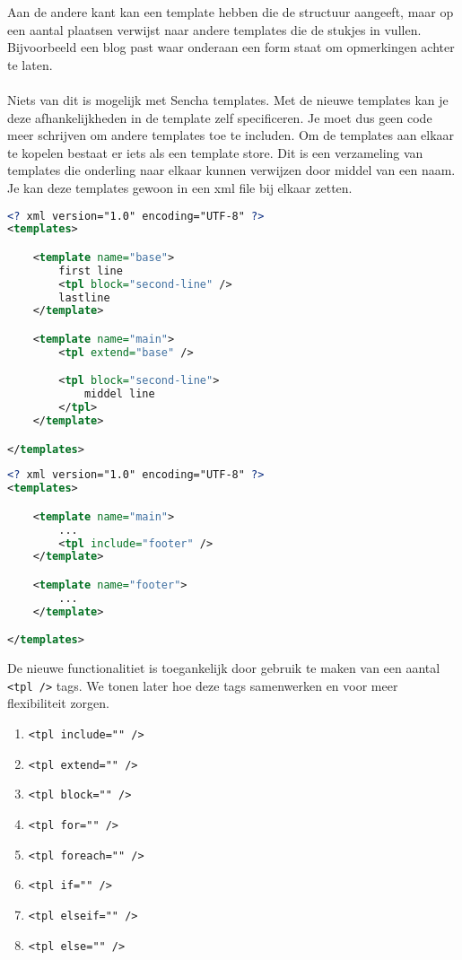Aan de andere kant kan een template hebben die de structuur aangeeft, maar op een aantal
plaatsen verwijst naar andere templates die de stukjes in vullen. Bijvoorbeeld een blog
past waar onderaan een form staat om opmerkingen achter te laten.

\paragraph {} Niets van dit is mogelijk met Sencha templates. Met de nieuwe templates kan
je deze afhankelijkheden in de template zelf specificeren. Je moet dus geen code meer
schrijven om andere templates toe te includen. Om de templates aan elkaar te kopelen
bestaat er iets als een template store. Dit is een verzameling van templates die onderling
naar elkaar kunnen verwijzen door middel van een naam. Je kan deze templates gewoon in een
xml file bij elkaar zetten.

\begin{lstlisting}[language=xml]
<? xml version="1.0" encoding="UTF-8" ?>
<templates>

	<template name="base">
		first line
		<tpl block="second-line" />
		lastline
	</template>

	<template name="main">
		<tpl extend="base" />

		<tpl block="second-line">
			middel line
		</tpl>
	</template>

</templates>
\end{lstlisting}

\begin{lstlisting}[language=xml]
<? xml version="1.0" encoding="UTF-8" ?>
<templates>

	<template name="main">
		...
		<tpl include="footer" />
	</template>

	<template name="footer">
		...
	</template>

</templates>
\end{lstlisting}

De nieuwe functionalitiet is toegankelijk door gebruik te maken van een aantal
\lstinline{<tpl />} tags. We tonen later hoe deze tags samenwerken en voor meer
flexibiliteit zorgen.

\begin{enumerate}
	\item \lstinline{<tpl include="" />}
	\item \lstinline{<tpl extend="" />}
	\item \lstinline{<tpl block="" />}
	\item \lstinline{<tpl for="" />}
	\item \lstinline{<tpl foreach="" />}
	\item \lstinline{<tpl if="" />}
	\item \lstinline{<tpl elseif="" />}
	\item \lstinline{<tpl else="" />}
\end{enumerate}


